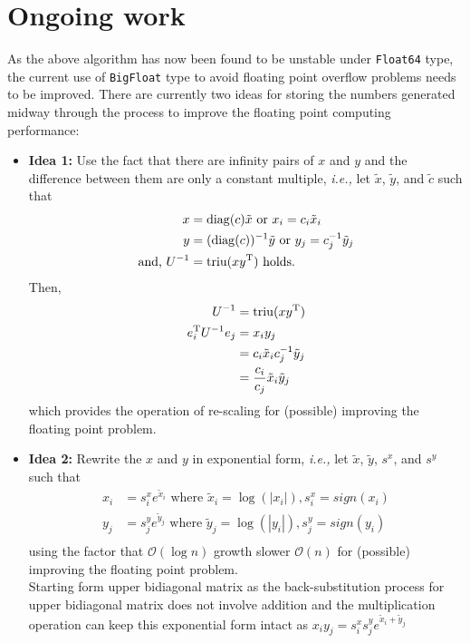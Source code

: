 \chapter{Ongoing work}

As the above algorithm has now been found to be unstable under \texttt{Float64} type, the current use of \texttt{BigFloat} type to avoid floating point overflow problems needs to be improved. There are currently two ideas for storing the numbers generated midway through the process to improve the floating point computing performance:

\begin{itemize}
    \item \textbf{Idea 1:} Use the fact that there are infinity pairs of $x$ and $y$ and the difference between     them are only a constant multiple, \textit{i.e.,} let $\tilde{x}$, $\tilde{y}$, and $\tilde{c}$ such        that\\
        \begin{align*}
            x &= \mathop{\mathrm{diag}}(c) \tilde{x}  \text{ or } x_i = c_i \tilde{x}_i \\
            y &= (\mathop{\mathrm{diag}}(c))^{-1} \tilde{y}  \text{ or } y_j = c^{-1}_{j} \tilde{y}_j \\
            \text{and, } U^{-1} &= \mathop{\mathrm{triu}}(x y^{\mathrm{T}}) \ \text{holds}.
        \end{align*}
        Then, 
        \begin{align*}
            U^{-1} &= \mathop{\mathrm{triu}}(x y^{\mathrm{T}}) \\
            e_{i}^{\mathrm{T}} U^{-1} e_{j} &= x_i y_j \\
                &= c_i \tilde{x}_i c^{-1}_{j} \tilde{y}_j \\
                &= \frac{c_i}{c_{j}} \tilde{x}_i \tilde{y}_j
        \end{align*}
        which provides the operation of re-scaling for (possible) improving the floating point problem.
    \item \textbf{Idea 2:} Rewrite the $x$ and $y$ in exponential form, \textit{i.e.,} let $\tilde{x}$, $\tilde{y}$, $s^{x}$, and $s^{y}$ such that
        \begin{align*}
            x_i &= s^{x}_{i} e^{\tilde{x}_i}  \text{ where } \tilde{x}_i = \log(|x_i|), s^{x}_{i} = sign(x_i) \\
            y_j &= s^{y}_{j} e^{\tilde{y}_j}  \text{ where } \tilde{y}_j = \log(|y_i|), s^{y}_{j} = sign(y_i) \\
        \end{align*}
        using the factor that $\mathcal{O}(\log n)$ growth slower $\mathcal{O}(n)$ for (possible) improving the floating point problem. \\
        Starting form upper bidiagonal matrix as the back-substitution process for upper bidiagonal matrix does not involve addition and the multiplication operation can keep this exponential form intact as $x_i y_j = s^{x}_{i} s^{y}_{j} e^{\tilde{x}_i + \tilde{y}_j}$
        
\end{itemize}

